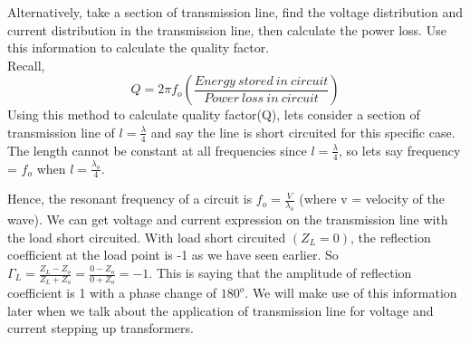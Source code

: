 Alternatively, take a section of transmission line, find the voltage distribution and current distribution in the transmission line, then calculate the power loss. Use this information to calculate the quality factor.\\
Recall,
\begin{equation}
Q=2\pi f_{o}\left(\frac{Energy\ stored\ in\ circuit}{Power\ loss\ in\ circuit}\right)
\end{equation}
Using this method to calculate quality factor(Q),
lets consider a section of transmission line of $ l=\frac{\lambda}{4} $ and say the line is short circuited for this specific case.\\
The length cannot be constant at all frequencies since $ l=\frac{\lambda}{4} $, so lets say frequency = $ f_{o} $ when $ l=\frac{\lambda_{o}}{4} $. 

Hence, the resonant frequency of a circuit is $ f_{o} =\frac{V}{\lambda_{o}}$ (where v = velocity of the wave). We can get voltage and current expression on the transmission line with the load short circuited. With load short circuited $(Z_{L}=0) $, the reflection coefficient at the load point is -1 as we have seen earlier. So $ \Gamma_{L} = \frac{Z_{L} - Z_{o}}{Z_{L} + Z_{o}} = \frac{0 - Z_{o}}{0 + Z_{o}} = -1 $. This is saying that the amplitude of reflection coefficient is 1 with a phase change of $ 180^{o} $. We will make use of this information later when we talk about the  application of transmission line for voltage and current stepping up transformers.

